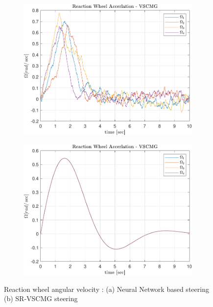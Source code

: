\begin{figure}[ht]
     \centering
     \begin{subfigure}[b]{0.49\textwidth}
         \centering
         \includegraphics[width=\textwidth]{figures/plots/Results/vs-nn-Omg.pdf}
          \caption{}
         \label{fig:nn_Omg}
     \end{subfigure}
     \begin{subfigure}[b]{0.49\textwidth}
         \centering
         \includegraphics[width=\textwidth]{figures/plots/Results/vs-vs-Omg.pdf}
          \caption{}
         \label{fig:vs_Omg}
     \end{subfigure}
     
        \caption{Reaction wheel angular velocity : (a) Neural Network based steering (b) SR-VSCMG steering}
        \label{fig:nnvscmg_Omg}
\end{figure}


